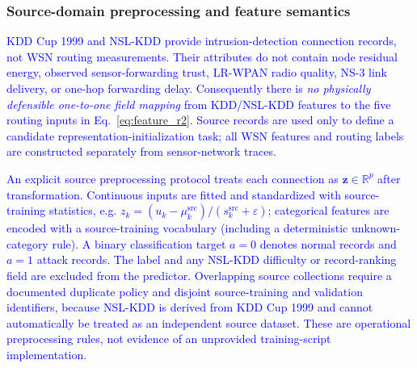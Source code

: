 \documentclass[pdflatex,sn-mathphys-num]{sn-jnl}
\newcommand{\Revised}[1]{\textcolor{blue}{#1}}
\begin{document}
\subsubsection{Source-domain preprocessing and feature semantics}
\Revised{KDD Cup 1999 and NSL-KDD provide intrusion-detection connection records, not WSN routing measurements. Their attributes do not contain node residual energy, observed sensor-forwarding trust, LR-WPAN radio quality, NS-3 link delivery, or one-hop forwarding delay. Consequently there is \emph{no physically defensible one-to-one field mapping} from KDD/NSL-KDD features to the five routing inputs in Eq.~\eqref{eq:feature_r2}. Source records are used only to define a candidate representation-initialization task; all WSN features and routing labels are constructed separately from sensor-network traces.}

\Revised{An explicit source preprocessing protocol treats each connection as $\mathbf z\in\mathbb R^p$ after transformation. Continuous inputs are fitted and standardized with source-training statistics, e.g. $z_k=(u_k-\mu_k^{\mathrm{src}})/(s_k^{\mathrm{src}}+\varepsilon)$; categorical features are encoded with a source-training vocabulary (including a deterministic unknown-category rule). A binary classification target $a=0$ denotes normal records and $a=1$ attack records. The label and any NSL-KDD difficulty or record-ranking field are excluded from the predictor. Overlapping source collections require a documented duplicate policy and disjoint source-training and validation identifiers, because NSL-KDD is derived from KDD Cup 1999 and cannot automatically be treated as an independent source dataset. These are operational preprocessing rules, not evidence of an unprovided training-script implementation.}
\end{document}
